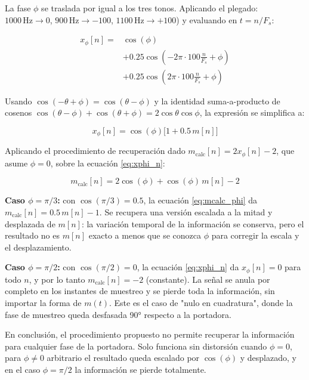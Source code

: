 \documentclass[conference]{IEEEtran}
\begin{document}
La fase $\phi$ se traslada por igual a los tres tonos. 
Aplicando el plegado: $1000\,\text{Hz}\rightarrow0$, $900\,\text{Hz}\rightarrow-100$, $1100\,\text{Hz}\rightarrow+100$) y evaluando en $t=n/F_s$:


\begin{equation}
\begin{aligned}
x_\phi[n] ={}& \cos(\phi) \\
              &+ 0.25\cos\!\left(-2\pi\cdot100
              \frac{n}{F_s}+\phi\right) \\
              &+ 0.25\cos\!\left(2\pi\cdot100
              \frac{n}{F_s}+\phi\right)
\end{aligned}
\label{eq:x_phi_n}
\end{equation}

Usando $\cos(-\theta+\phi)=\cos(\theta-\phi)$ y la identidad suma-a-producto de cosenos $\cos(\theta-\phi)+\cos(\theta+\phi)=2\cos\theta\cos\phi$, la expresión se simplifica a:

\begin{equation}
x_\phi[n] = \cos(\phi)\big[1 + 0.5\,m[n]\big]
\label{eq:xphi_n}
\end{equation}

Aplicando el procedimiento de recuperación dado $m_{\text{calc}}[n]=2x_\phi[n]-2$, que asume $\phi=0$, sobre la ecuación \eqref{eq:xphi_n}:

\begin{equation}
m_{\text{calc}}[n] = 2\cos(\phi) + \cos(\phi)\,m[n] - 2
\label{eq:mcalc_phi}
\end{equation}

\textbf{Caso $\phi=\pi/3$:} con $\cos(\pi/3)=0.5$, la ecuación \eqref{eq:mcalc_phi} da $m_{\text{calc}}[n] = 0.5\,m[n]-1$. Se recupera una versión escalada a la mitad y desplazada de $m[n]$: la variación temporal de la información se conserva, pero el resultado no es $m[n]$ exacto a menos que se conozca $\phi$ para corregir la escala y el desplazamiento.

\textbf{Caso $\phi=\pi/2$:} con $\cos(\pi/2)=0$, la ecuación \eqref{eq:xphi_n} da $x_\phi[n]=0$ para todo $n$, y por lo tanto $m_{\text{calc}}[n]=-2$ (constante). La señal se anula por completo en los instantes de muestreo y se pierde toda la información, sin importar la forma de $m(t)$. Este es el caso de "nulo en cuadratura", donde la fase de muestreo queda desfasada 90° respecto a la portadora.

En conclusión, el procedimiento propuesto no permite recuperar la información para cualquier fase de la portadora. Solo funciona sin distorsión cuando $\phi=0$, para $\phi\neq0$ arbitrario el resultado queda escalado por $\cos(\phi)$ y desplazado, y en el caso $\phi=\pi/2$ la información se pierde totalmente.
\end{document}
